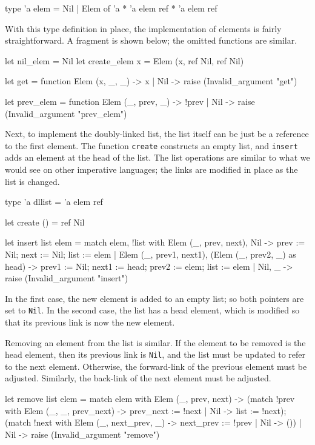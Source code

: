 \begin{ocaml}
type 'a elem =
   Nil
 | Elem of 'a * 'a elem ref * 'a elem ref
\end{ocaml}
%
With this type definition in place, the implementation of elements is fairly straightforward.  A
fragment is shown below; the omitted functions are similar.

\begin{ocaml}
let nil_elem = Nil
let create_elem x = Elem (x, ref Nil, ref Nil)

let get = function
   Elem (x, _, _) -> x
 | Nil -> raise (Invalid_argument "get")

let prev_elem = function
   Elem (_, prev, _) -> !prev
 | Nil -> raise (Invalid_argument "prev_elem")
\end{ocaml}
%
Next, to implement the doubly-linked list, the list itself can be just be a reference to the first
element.  The function \hbox{\lstinline/create/} constructs an empty list, and \hbox{\lstinline/insert/} adds an
element at the head of the list.  The list operations are similar to what we would see on other
imperative languages; the links are modified in place as the list is changed.

\begin{ocaml}
type 'a dllist = 'a elem ref

let create () = ref Nil

let insert list elem =
   match elem, !list with
      Elem (_, prev, next), Nil ->
         prev := Nil;
         next := Nil;
         list := elem
    | Elem (_, prev1, next1), (Elem (_, prev2, _) as head) ->
         prev1 := Nil;
         next1 := head;
         prev2 := elem;
         list := elem
    | Nil, _ ->
         raise (Invalid_argument "insert")
\end{ocaml}
%
In the first case, the new element is added to an empty list; so both pointers are set
to \hbox{\lstinline/Nil/}.  In the second case, the list has a head element, which is modified so that its
previous link is now the new element.

Removing an element from the list is similar.  If the element to be removed is the head element,
then its previous link is \hbox{\lstinline/Nil/}, and the list must be updated to refer to the next
element.  Otherwise, the forward-link of the previous element must be adjusted.  Similarly, the
back-link of the next element must be adjusted.

\begin{ocaml}
let remove list elem =
   match elem with
      Elem (_, prev, next) ->
         (match !prev with
             Elem (_, _, prev_next) -> prev_next := !next
           | Nil -> list := !next);
         (match !next with
             Elem (_, next_prev, _) -> next_prev := !prev
           | Nil -> ())
    | Nil ->
         raise (Invalid_argument "remove")
\end{ocaml}

